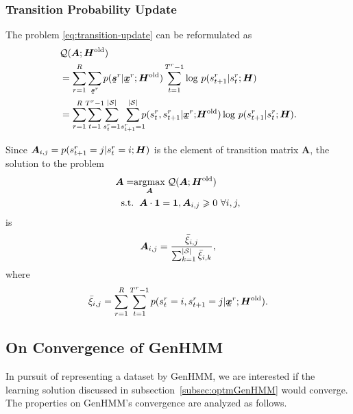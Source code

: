 \subsubsection{Transition Probability Update}
The problem \eqref{eq:transition-update} can be reformulated as
\begin{align}
  &\Qq(\bm{A}; \bm{H}^{\mathrm{old}})\nonumber \\
  &= \sum_{r=1}^{R} \sum_{\ubmr{s}{r}}{p(\ubmr{s}{r}| \ubmr{x}{r}; \bm{H}^{\mathrm{old}})} \sum_{t=1}^{T^{r}-1}\log\,p(\smtr{s}{t+1}{r}|\smtr{s}{t}{r}; \bm{H}) \nonumber \\
  &= \sum_{r=1}^{R} \hspace{-0.1cm}\sum_{t=1}^{T^{r}-1}\hspace{-0.1cm} \sum_{\smtr{s}{t}{r}=1}^{|\Ss|}\hspace{-0.05cm}\sum_{\smtr{s}{t+1}{r}=1}^{|\Ss|}\hspace{-0.2cm}{p(\smtr{s}{t}{r}, \smtr{s}{t+1}{r}| \ubmr{x}{r};\hspace{-0.05cm} \bm{H}^{\mathrm{old}})} \log\,p(\smtr{s}{t+1}{r}|\smtr{s}{t}{r}; \bm{H}).
\end{align}

Since $\bm{A}_{i, j}  = p(\smtr{s}{t+1}{r}=j|\smtr{s}{t}{r}=i; \bm{H})$ is the element of transition matrix $\bm{A}$, the solution to the problem
\begin{align}\label{eq:update-transition-prob}
  \bm{A} = &\uargmax{\bm{A}} \Qq(\bm{A}; \bm{H}^{\mathrm{old}}) \nonumber \\
  \mathrm{s.t.} &\hspace{0.2cm} \bm{A} \cdot \bm{1} = \bm{1}, \bm{A}_{i,j} \geq 0 \,\, \forall i,j,
\end{align}
is
\begin{equation}
  \bm{A}_{i,j} = \frac{\bar{\xi}_{i,j}}{\sum_{k = 1}^{|\Ss|} \bar{\xi}_{i,k}},
\end{equation}
where
\begin{equation}\label{eq:update-transition-solt}
  \bar{\xi}_{i,j} = \sum_{r= 1}^{R} \sum_{t= 1}^{T^{r}-1}{p(\smtr{s}{t}{r}=i, \smtr{s}{t+1}{r}=j| \ubmr{x}{r}; \bm{H}^{\mathrm{old}})}.
\end{equation}
\subsection{On Convergence of GenHMM}
In pursuit of representing a dataset by GenHMM,  we are interested if the learning solution discussed in subsection~\ref{subsec:optmGenHMM} would converge. The properties on GenHMM's convergence are analyzed as follows.

